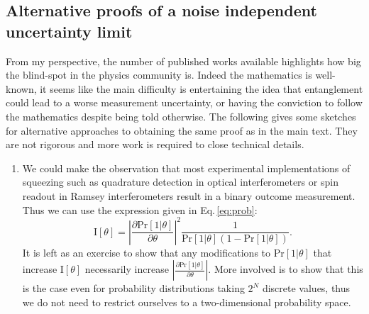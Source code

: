 \documentclass[reqno]{amsart}
\def\func#1#2{\mathrm{#1}\left[#2\right]}
\begin{document}
\subsection{Alternative proofs of a noise independent uncertainty limit}\label{App:Proofs}
From my perspective, the number of published works available highlights how big the blind-spot in the physics community is. Indeed the mathematics is well-known, it seems like the main difficulty is entertaining the idea that entanglement could lead to a worse measurement uncertainty, or having the conviction to follow the mathematics despite being told otherwise. The following gives some sketches for alternative approaches to obtaining the same proof as in the main text. They are not rigorous and more work is required to close technical details. 
\begin{enumerate}
\item We could make the observation that most experimental implementations of squeezing such as quadrature detection in optical interferometers or spin readout in Ramsey interferometers result in a binary outcome measurement. Thus we can use the expression given in Eq.\,\eqref{eq:prob}:
\[\func{I}{\theta} = \left|\frac{\partial \func{Pr}{1|\theta}}{\partial \theta}\right|^{2}\frac{1}{\func{Pr}{1|\theta}\left(1-\func{Pr}{1|\theta}\right)}.\]
It is left as an exercise to show that any modifications to $\func{Pr}{1|\theta}$ that increase $\func{I}{\theta}$ necessarily increase $\left|\frac{\partial \func{Pr}{1|\theta}}{\partial \theta}\right|$. More involved is to show that this is the case even for probability distributions taking $2^N$ discrete values, thus we do not need to restrict ourselves to a two-dimensional probability space.


\end{enumerate}
\end{document}
